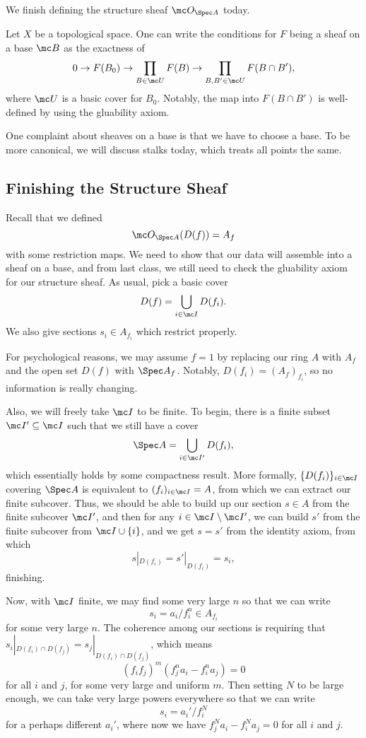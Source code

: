 \documentclass[../notes.tex]{subfiles}
\begin{document}
We finish defining the structure sheaf $\mc O_{\Spec A}$ today.
\begin{remark}
	Let $X$ be a topological space. One can write the conditions for $F$ being a sheaf on a base $\mc B$ as the exactness of
	\[0\to F(B_0)\to\prod_{B\in\mc U}F(B)\to\prod_{B,B'\in\mc U}F(B\cap B'),\]
	where $\mc U$ is a basic cover for $B_0$. Notably, the map into $F(B\cap B')$ is well-defined by using the gluability axiom.
\end{remark}
\begin{remark}
	One complaint about sheaves on a base is that we have to choose a base. To be more canonical, we will discuss stalks today, which treats all points the same.
\end{remark}

\subsection{Finishing the Structure Sheaf}
Recall that we defined
\[\mc O_{\Spec A}(D(f))=A_f\]
with some restriction maps. We need to show that our data will assemble into a sheaf on a base, and from last class, we still need to check the gluability axiom for our structure sheaf. As usual, pick a basic cover
\[D(f)=\bigcup_{i\in\mc I}D(f_i).\]
We also give sections $s_i\in A_{f_i}$ which restrict properly.

For psychological reasons, we may assume $f=1$ by replacing our ring $A$ with $A_f$ and the open set $D(f)$ with $\Spec A_f$. Notably, $D(f_i)=(A_f)_{f_i}$, so no information is really changing.

Also, we will freely take $\mc I$ to be finite. To begin, there is a finite subset $\mc I'\subseteq\mc I$ such that we still have a cover
\[\Spec A=\bigcup_{i\in\mc I'}D(f_i),\]
which essentially holds by some compactness result. More formally, $\{D(f_i)\}_{i\in\mc I}$ covering $\Spec A$ is equivalent to $(f_i)_{i\in\mc I}=A$, from which we can extract our finite subcover. Thus, we should be able to build up our section $s\in A$ from the finite subcover $\mc I'$, and then for any $i\in\mc I\setminus\mc I'$, we can build $s'$ from the finite subcover from $\mc I\cup\{i\}$, and we get $s=s'$ from the identity axiom, from which
\[s|_{D(f_i)}=s'|_{D(f_i)}=s_i,\]
finishing.

Now, with $\mc I$ finite, we may find some very large $n$ so that we can write
\[s_i=a_i/f_i^n\in A_{f_i}\]
for some very large $n$. The coherence among our sections is requiring that $s_i|_{D(f_i)\cap D(f_j)}=s_j|_{D(f_i)\cap D(f_j)}$, which means
\[(f_if_j)^m\left(f_j^na_i-f_i^na_j\right)=0\]
for all $i$ and $j$, for some very large and uniform $m$. Then setting $N$ to be large enough, we can take very large powers everywhere so that we can write
\[s_i=a_i'/f_i^N\]
for a perhaps different $a_i'$, where now we have $f_j^Na_i-f_i^Na_j=0$ for all $i$ and $j$.
\end{document}
